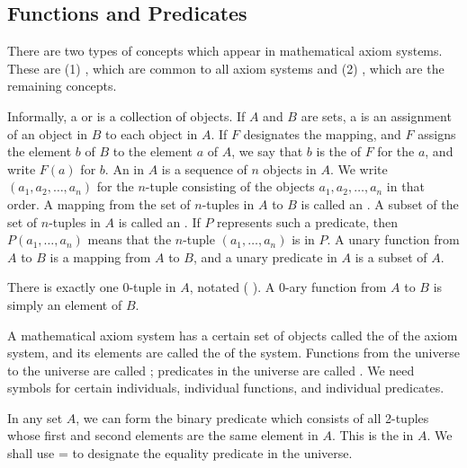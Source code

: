 \subsection{Functions and Predicates}


There are two types of concepts which appear in mathematical axiom systems.
These are (1) , which are common to all axiom systems and (2) , which are the remaining concepts.

Informally, a  or  is a collection of objects.
If $A$ and $B$ are sets, a  is an assignment of an object in $B$ to each object in $A$.
If $F$ designates the mapping, and $F$ assigns the element $b$ of $B$ to the element $a$ of $A$, we say that $b$ is the  of $F$ for the  $a$, and write $F(a)$ for $b$.
An  in $A$ is a sequence of $n$ objects in $A$.
We write $(a_1, a_2, \ldots, a_n)$ for the $n$-tuple consisting of the objects $a_1, a_2, \ldots, a_n$ in that order.
A mapping from the set of $n$-tuples in $A$ to $B$ is called an .
A subset of the set of $n$-tuples in $A$ is called an .
If $P$ represents such a predicate, then $P(a_1, \ldots, a_n)$ means that the $n$-tuple $(a_1, \ldots, a_n)$ is in $P$.
A unary function from $A$ to $B$ is a mapping from $A$ to $B$, and a unary predicate in $A$ is a subset of $A$.

There is exactly one 0-tuple in $A$, notated ( ).
A 0-ary function from $A$ to $B$ is simply an element of $B$.


A mathematical axiom system has a certain set of objects called the  of the axiom system, and its elements are called the  of the system.
Functions from the universe to the universe are called ; predicates in the universe are called .
We need symbols for certain individuals, individual functions, and individual predicates.

In any set $A$, we can form the binary predicate which consists of all 2-tuples whose first and second elements are the same element in $A$.
This is the  in $A$.
We shall use = to designate the equality predicate in the universe.


